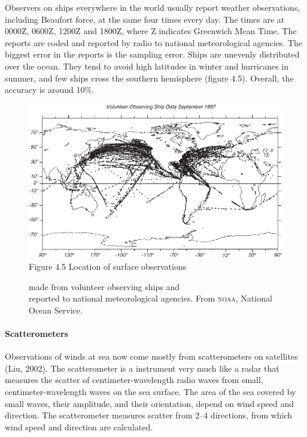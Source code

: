 Observers on ships everywhere in the world usually report weather
observations, including Beaufort force, at the same four times every
day. The times are at 0000Z, 0600Z, 1200Z and 1800Z, where Z indicates
Greenwich Mean Time. The reports are coded and reported by radio to
national meteorological agencies. The biggest error in the reports is
the sampling error. Ships are unevenly
distributed over the ocean. They tend to avoid high latitudes in
winter and hurricanes in summer, and few ships cross the southern
hemisphere (figure 4.5). Overall, the
accuracy is around 10\%.


\begin{figure}[t!]
\centering
\includegraphics{pics/shiplocations}
\footnotesize
Figure 4.5 Location of surface observations \rule{0mm}{3ex}made from
volunteer observing ships and\\ reported to national meteorological
agencies. From \textsc{noaa}, National Ocean Service.

\label{fig:shiplocations}
\vspace{-4ex}
\end{figure}

\paragraph{Scatterometers}
 Observations of
winds at sea now come mostly from scatterometers on satellites (Liu,
2002). The scatterometer is a instrument very much like a radar that
measures the scatter of centimeter-wavelength radio waves from small,
centimeter-wavelength waves on the sea surface. The area of the sea
covered by small waves, their amplitude, and their orientation, depend
on wind speed and direction. The scatterometer measures scatter from
2--4 directions, from which wind speed and direction are calculated.

